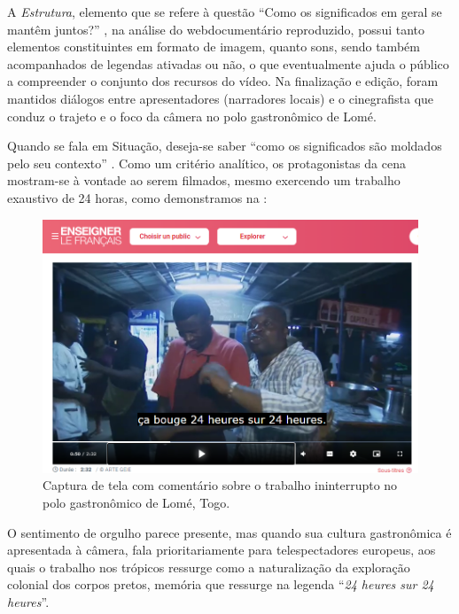 \documentclass[portuguese]{textolivre}
\begin{document}
A \emph{Estrutura}, elemento que se refere à questão “Como os significados em geral se mantêm juntos?” \cite[p. 293]{kalantzis_letramentos_2020}, na análise do webdocumentário reproduzido, possui tanto elementos constituintes em formato de imagem, quanto sons, sendo também acompanhados de legendas ativadas ou não, o que eventualmente ajuda o público a compreender o conjunto dos recursos do vídeo. Na finalização e edição, foram mantidos diálogos entre apresentadores (narradores locais) e o cinegrafista que conduz o trajeto e o foco da câmera no polo gastronômico de  Lomé. 

Quando se fala em Situação, deseja-se saber “como os significados são moldados pelo seu contexto” \cite[p. 293]{kalantzis_letramentos_2020}. Como um critério analítico, os protagonistas da cena mostram-se à vontade ao serem filmados, mesmo exercendo um trabalho exaustivo de 24 horas, como demonstramos na :

\begin{figure}[h!]
    \centering
    \begin{minipage}{.55\textwidth}
    \includegraphics[width=\linewidth]{Fig8.png}
    \caption{Captura de tela com comentário sobre o trabalho ininterrupto no polo gastronômico de Lomé, Togo.}
    \label{fig8}
    \end{minipage}
\end{figure}

O sentimento de orgulho parece presente, mas quando sua cultura gastronômica é apresentada à câmera, fala prioritariamente para telespectadores europeus, aos quais o trabalho nos trópicos ressurge como a naturalização da exploração colonial dos corpos pretos, memória que ressurge na legenda “\textit{24 heures sur 24 heures}”. 
\end{document}
